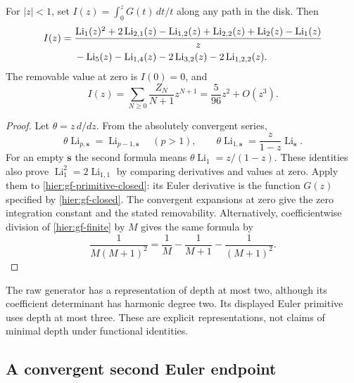 \begin{corollary}
\label{hier:gf-primitive}
For $|z|<1$, set
$I(z)=\int_0^zG(t)\,dt/t$ along any path in the disk.  Then
\begin{align}\label{hier:gf-primitive-closed}
 I(z)={}&\frac{
 \operatorname{Li}_1(z)^2+2\operatorname{Li}_{2,1}(z)
 -\operatorname{Li}_{1,2}(z)+\operatorname{Li}_{2,2}(z)
 +\operatorname{Li}_2(z)-\operatorname{Li}_1(z)}{z}\notag\\
 &-\operatorname{Li}_5(z)-\operatorname{Li}_{1,4}(z)
     -2\operatorname{Li}_{3,2}(z)
     -2\operatorname{Li}_{1,2,2}(z).
\end{align}
The removable value at zero is $I(0)=0$, and
\[
 I(z)=\sum_{N\ge0}\frac{Z_N}{N+1}z^{N+1}
     =\frac5{96}z^2+O(z^3).
\]
\end{corollary}
\begin{proof}
Let $\theta=z\,d/dz$.  From the absolutely convergent series,
\[
 \theta\operatorname{Li}_{p,\boldsymbol s}
      =\operatorname{Li}_{p-1,\boldsymbol s}\quad(p>1),\qquad
 \theta\operatorname{Li}_{1,\boldsymbol s}
      =\frac{z}{1-z}\operatorname{Li}_{\boldsymbol s}.
\]
For an empty $\boldsymbol s$ the second formula means
$\theta\operatorname{Li}_1=z/(1-z)$.
These identities also prove
$\operatorname{Li}_1^2=2\operatorname{Li}_{1,1}$ by comparing
derivatives and values at zero.  Apply them to
\eqref{hier:gf-primitive-closed}: its Euler derivative is the function $G(z)$ specified by
\eqref{hier:gf-closed}.  The convergent expansions at zero give the
zero integration constant and the stated removability.  Alternatively,
coefficientwise division of \eqref{hier:gf-finite} by $M$ gives the
same formula by
\[
 \frac1{M(M+1)^2}
  =\frac1M-\frac1{M+1}-\frac1{(M+1)^2}.
\]
\end{proof}

The raw generator has a representation of depth at most two, although
its coefficient determinant has harmonic degree two.  Its displayed
Euler primitive uses depth at most three.  These are explicit
representations, not claims of minimal depth under functional identities.

\subsection{A convergent second Euler endpoint}

